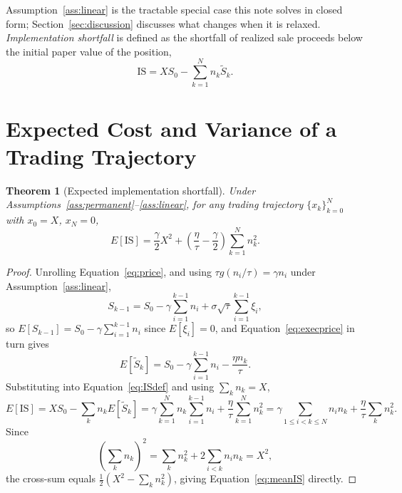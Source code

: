 \documentclass[11pt]{article}
\newtheorem{theorem}{Theorem}
\theoremstyle{remark}
\theoremstyle{definition}
\begin{document}
Assumption~\ref{ass:linear} is the tractable special case this note solves in closed form; Section~\ref{sec:discussion} discusses what changes when it is relaxed. \emph{Implementation shortfall} is defined as the shortfall of realized sale proceeds below the initial paper value of the position,
\begin{equation}
\text{IS} = X S_0 - \sum_{k=1}^{N} n_k \tilde S_k.
\label{eq:ISdef}
\end{equation}

\section{Expected Cost and Variance of a Trading Trajectory}
\label{sec:moments}

\begin{theorem}[Expected implementation shortfall]
\label{thm:mean}
Under Assumptions~\ref{ass:permanent}--\ref{ass:linear}, for any trading trajectory $\{x_k\}_{k=0}^N$ with $x_0=X$, $x_N=0$,
\begin{equation}
E[\text{IS}] = \frac{\gamma}{2}X^2 + \left(\frac{\eta}{\tau}-\frac{\gamma}{2}\right)\sum_{k=1}^{N} n_k^2.
\label{eq:meanIS}
\end{equation}
\end{theorem}
\begin{proof}
Unrolling Equation~\eqref{eq:price}, and using $\tau g(n_i/\tau)=\gamma n_i$ under Assumption~\ref{ass:linear},
\begin{equation*}
S_{k-1} = S_0 - \gamma\sum_{i=1}^{k-1} n_i + \sigma\sqrt\tau\sum_{i=1}^{k-1}\xi_i,
\end{equation*}
so $E[S_{k-1}] = S_0-\gamma\sum_{i=1}^{k-1}n_i$ since $E[\xi_i]=0$, and Equation~\eqref{eq:execprice} in turn gives
\begin{equation*}
E[\tilde S_k] = S_0 - \gamma\sum_{i=1}^{k-1}n_i - \frac{\eta n_k}{\tau}.
\end{equation*}
Substituting into Equation~\eqref{eq:ISdef} and using $\sum_k n_k = X$,
\begin{equation*}
E[\text{IS}] = XS_0 - \sum_k n_k E[\tilde S_k] = \gamma\sum_{k=1}^N n_k\sum_{i=1}^{k-1}n_i + \frac{\eta}{\tau}\sum_{k=1}^N n_k^2 = \gamma\sum_{1\le i<k\le N} n_in_k + \frac{\eta}{\tau}\sum_k n_k^2.
\end{equation*}
Since
\begin{equation*}
\left(\sum_k n_k\right)^{\!2} = \sum_k n_k^2 + 2\sum_{i<k}n_in_k = X^2,
\end{equation*}
the cross-sum equals $\tfrac12\left(X^2-\sum_k n_k^2\right)$, giving Equation~\eqref{eq:meanIS} directly.
\end{proof}
\end{document}
